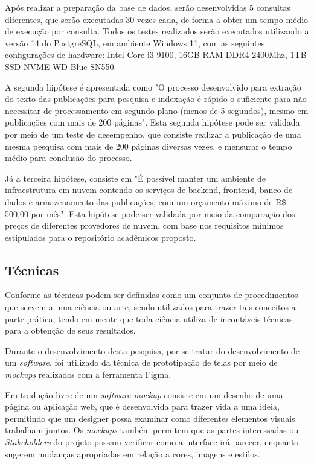 Após realizar a preparação da base de dados, serão desenvolvidas
5 consultas diferentes, que serão executadas 30 vezes cada, de forma a obter um tempo
médio de execução por consulta. Todos os testes realizados serão executados utilizando
a versão 14 do PostgreSQL, em ambiente Windows 11, com as seguintes configurações de hardware:
Intel Core i3 9100, 16GB RAM DDR4 2400Mhz, 1TB SSD NVME WD Blue SN550.

A segunda hipótese é apresentada como "O processo desenvolvido
para extração do texto das publicações para pesquisa e indexação
é rápido o suficiente para não necessitar de processamento em
segundo plano (menos de 5 segundos), mesmo em publicações com mais
de 200 páginas". Esta segunda hipótese pode ser validada por meio
de um teste de desempenho, que consiste realizar a publicação de uma
mesma pesquisa com mais de 200 páginas diversas vezes, e mensurar
o tempo médio para conclusão do processo.

Já a terceira hipótese, consiste em "É possível manter um ambiente
de infraestrutura em nuvem contendo os serviços de backend,
frontend, banco de dados e armazenamento das publicações,
com um orçamento máximo de R\$ 500,00 por mês". Esta hipótese
pode ser validada por meio da comparação dos preços de diferentes
provedores de nuvem, com base nos requisitos mínimos estipulados
para o repositório acadêmicos proposto.

\subsection{Técnicas}

Conforme \citep[p. 174]{LAKATOS2003:metodologia} as técnicas podem
ser definidas como um conjunto de procedimentos que servem a
uma ciência ou arte, sendo utilizados para trazer tais
conceitos a parte prática, tendo em mente que toda ciência utiliza
de incontáveis técnicas para a obtenção de seus resultados.

Durante o desenvolvimento desta pesquisa, por se tratar do
desenvolvimento de um \emph{software}, foi utilizado da técnica
de prototipação de telas por meio de \emph{mockups} realizados
com a ferramenta Figma.

Em tradução livre de \cite{uzayr:mockups} um \emph{software mockup}
consiste em um desenho de uma página ou aplicação web,
que é desenvolvida para trazer vida a uma ideia, permitindo
que um designer possa examinar como diferentes elementos visuais
trabalham juntos. Os \emph{mockups} também permitem que as partes
interessadas ou \emph{Stakeholders} do projeto possam verificar como a
interface irá parecer, enquanto sugerem mudanças
apropriadas em relação a cores, imagens e estilos.

